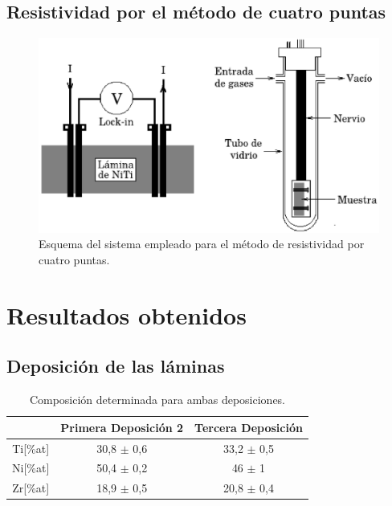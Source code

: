 \documentclass[11pt]{beamer}
\begin{document}
	\subsection{Resistividad por el método de cuatro puntas}
		\begin{frame}
			\begin{figure}[H]
				\centering
				\includegraphics[scale=0.4]{img/resistividad.eps}
				\caption{Esquema del sistema empleado para el método de 								 resistividad por cuatro puntas.}
			\end{figure}
		\end{frame}
	
\section{Resultados obtenidos}
	\subsection{Deposición de las láminas}
		\begin{frame}
			\begin{table}[H]
				\centering
				\begin{tabular}{c|c|c|}
				\cline{2-3}
				\multicolumn{1}{l|}{} & Primera Deposición 2 & Tercera Deposición \\ \hline
				\multicolumn{1}{|c|}{Ti{[}\%at{]}} & 30,8 $\pm$ 0,6 & 33,2 $\pm$ 0,5 \\ \hline
				\multicolumn{1}{|c|}{Ni{[}\%at{]}} & 50,4 $\pm$ 0,2 & 46 $\pm$ 1 \\ \hline
				\multicolumn{1}{|c|}{Zr{[}\%at{]}} & 18,9 $\pm$ 0,5 & 20,8 $\pm$ 0,4 \\ \hline
				\end{tabular}
				\caption{Composición determinada para ambas deposiciones.}
				\label{compositionAvg}
			\end{table}
		\end{frame}
\end{document}
